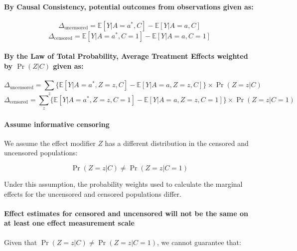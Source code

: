 \documentclass[
  singlecolumn]{article}
\let\oldparagraph\paragraph
\renewcommand{\paragraph}[1]{\oldparagraph{#1}\mbox{}}
\begin{document}
\paragraph{By Causal Consistency, potential outcomes from observations
given
as:}\label{by-causal-consistency-potential-outcomes-from-observations-given-as}

\[
\Delta_{\text{uncensored}} = \mathbb{E}[Y|A=a^*,C] - \mathbb{E}[Y|A=a,C]
\] \[
\Delta_{\text{censored}} = \mathbb{E}[Y|A=a^*,C=1] - \mathbb{E}[Y|A=a,C=1]
\]

\paragraph{\texorpdfstring{By the Law of Total Probability, Average
Treatment Effects weighted by \(\Pr(Z|C)\) given
as:}{By the Law of Total Probability, Average Treatment Effects weighted by \textbackslash Pr(Z\textbar C) given as:}}\label{by-the-law-of-total-probability-average-treatment-effects-weighted-by-przc-given-as}

\[
\Delta_{\text{uncensored}} = \sum_{z} \bigg\{\mathbb{E}[Y|A=a^*,Z=z,C] - \mathbb{E}[Y|A=a,Z=z,C]\bigg\}\times \Pr(Z=z|C)
\] \[
\Delta_{\text{censored}} = \sum_{z} \bigg\{\mathbb{E}[Y|A=a^*,Z=z,C=1] - \mathbb{E}[Y|A=a,Z=z,C=1]\bigg\} \times \Pr(Z=z|C=1)
\]

\paragraph{Assume informative
censoring}\label{assume-informative-censoring}

We assume the effect modifier \(Z\) has a different distribution in the
censored and uncensored populations:

\[\Pr(Z=z|C) \neq \Pr(Z=z|C=1)\]

Under this assumption, the probability weights used to calculate the
marginal effects for the uncensored and censored populations differ.

\paragraph{Effect estimates for censored and uncensored will not be the
same on at least one effect measurement
scale}\label{effect-estimates-for-censored-and-uncensored-will-not-be-the-same-on-at-least-one-effect-measurement-scale}

Given that \(\Pr(Z=z|C) \neq \Pr(Z=z|C=1)\), we cannot guarantee that:
\end{document}
